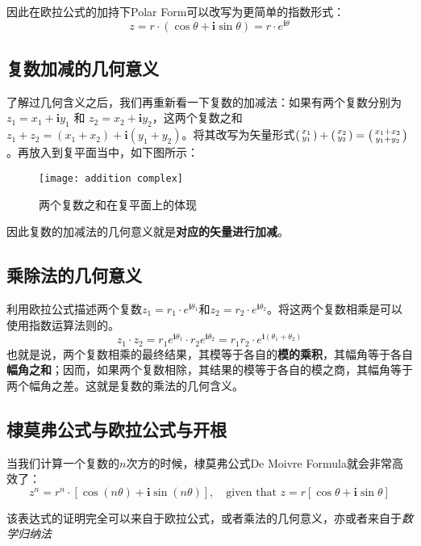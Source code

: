 因此在欧拉公式的加持下Polar Form可以改写为更简单的指数形式：
\[
	z=r\cdot (\cos \theta + \mathbf{i} \sin \theta)= r\cdot e^{\mathbf{i} \theta}
\]

\subsection*{复数加减的几何意义}
了解过几何含义之后，我们再重新看一下复数的加减法：如果有两个复数分别为$z_1=x_1 + \mathbf{i} y_1$ 和 $z_2=x_2 + \mathbf{i} y_2$，这两个复数之和$z_1+z_2=(x_1+x_2) +\mathbf{i}(y_1+y_2)$。将其改写为矢量形式$\left(\begin{smallmatrix}x_1\\y_1\end{smallmatrix}\right) + \left(\begin{smallmatrix}x_2\\y_2\end{smallmatrix}\right) =\left(\begin{smallmatrix}x_1+x_2 \\ y_1+y_2\end{smallmatrix}\right)$。再放入到复平面当中，如下图所示：
\begin{figure}[H]
\centering
\texttt{[image: addition complex]}
\caption{两个复数之和在复平面上的体现}
\end{figure}

因此复数的加减法的几何意义就是\textbf{对应的矢量进行加减}。

\subsection*{乘除法的几何意义}
利用欧拉公式描述两个复数$z_1=r_1\cdot e^{\mathbf{i} \theta_1}$和$z_2=r_2\cdot e^{\mathbf{i} \theta_2}$。将这两个复数相乘是可以使用指数运算法则的。
\[
	z_1\cdot z_2 = r_1e^{\mathbf{i} \theta_1} \cdot  r_2e^{\mathbf{i} \theta_2} = r_1r_2 \cdot e^{\mathbf{i}( \theta_1+\theta_2)}
\]
也就是说，两个复数相乘的最终结果，其模等于各自的\textbf{模的乘积}，其幅角等于各自\textbf{幅角之和}；因而，如果两个复数相除，其结果的模等于各自的模之商，其幅角等于两个幅角之差。这就是复数的乘法的几何含义。

\subsection*{棣莫弗公式与欧拉公式与开根}
\label{subsec:De moivre}
当我们计算一个复数的$n$次方的时候，棣莫弗公式De Moivre Formula就会非常高效了：
\[
	z^n=r^n \cdot \left[\cos(n\theta) +\mathbf{i} \sin(n\theta) \right],\quad  \text{given that }z=r\left[\cos\theta +\mathbf{i} \sin\theta \right]
\]

该表达式的证明完全可以来自于欧拉公式，或者乘法的几何意义，亦或者来自于\emph{数学归纳法}

